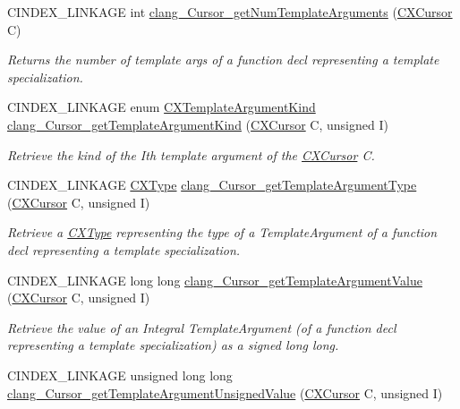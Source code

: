 \begin{DoxyCompactItemize}
C\+I\+N\+D\+E\+X\+\_\+\+L\+I\+N\+K\+A\+GE int \mbox{\hyperlink{group__CINDEX__TYPES_gaa34e031c03fafb63accf8f9842a4b948}{clang\+\_\+\+Cursor\+\_\+get\+Num\+Template\+Arguments}} (\mbox{\hyperlink{structCXCursor}{C\+X\+Cursor}} C)
\begin{DoxyCompactList}\small\item\em Returns the number of template args of a function decl representing a template specialization. \end{DoxyCompactList}\item 
C\+I\+N\+D\+E\+X\+\_\+\+L\+I\+N\+K\+A\+GE enum \mbox{\hyperlink{group__CINDEX__TYPES_gaf23c39e68c1fc756643583b43ee3e494}{C\+X\+Template\+Argument\+Kind}} \mbox{\hyperlink{group__CINDEX__TYPES_gad657c21f57e009899bd6a0ab618ee321}{clang\+\_\+\+Cursor\+\_\+get\+Template\+Argument\+Kind}} (\mbox{\hyperlink{structCXCursor}{C\+X\+Cursor}} C, unsigned I)
\begin{DoxyCompactList}\small\item\em Retrieve the kind of the I\textquotesingle{}th template argument of the \mbox{\hyperlink{structCXCursor}{C\+X\+Cursor}} C. \end{DoxyCompactList}\item 
C\+I\+N\+D\+E\+X\+\_\+\+L\+I\+N\+K\+A\+GE \mbox{\hyperlink{structCXType}{C\+X\+Type}} \mbox{\hyperlink{group__CINDEX__TYPES_gae3fab0d8906e4531a1b7fbe77b4b4bc1}{clang\+\_\+\+Cursor\+\_\+get\+Template\+Argument\+Type}} (\mbox{\hyperlink{structCXCursor}{C\+X\+Cursor}} C, unsigned I)
\begin{DoxyCompactList}\small\item\em Retrieve a \mbox{\hyperlink{structCXType}{C\+X\+Type}} representing the type of a Template\+Argument of a function decl representing a template specialization. \end{DoxyCompactList}\item 
C\+I\+N\+D\+E\+X\+\_\+\+L\+I\+N\+K\+A\+GE long long \mbox{\hyperlink{group__CINDEX__TYPES_ga46e363545effaa0794a2ba4bcfae1fe3}{clang\+\_\+\+Cursor\+\_\+get\+Template\+Argument\+Value}} (\mbox{\hyperlink{structCXCursor}{C\+X\+Cursor}} C, unsigned I)
\begin{DoxyCompactList}\small\item\em Retrieve the value of an Integral Template\+Argument (of a function decl representing a template specialization) as a signed long long. \end{DoxyCompactList}\item 
C\+I\+N\+D\+E\+X\+\_\+\+L\+I\+N\+K\+A\+GE unsigned long long \mbox{\hyperlink{group__CINDEX__TYPES_ga08dac49044448c022457224e73223eb2}{clang\+\_\+\+Cursor\+\_\+get\+Template\+Argument\+Unsigned\+Value}} (\mbox{\hyperlink{structCXCursor}{C\+X\+Cursor}} C, unsigned I)

\end{DoxyCompactItemize}
